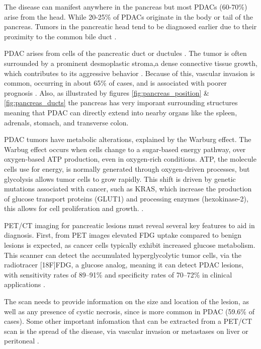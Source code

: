 \documentclass[11pt]{article} %
\begin{document}
The disease can manifest anywhere in the pancreas but most PDACs (60-70\%) arise from the head. While 20-25\% of PDACs originate in the body or tail of the pancreas. Tumors in the pancreatic head tend to be diagnosed earlier due to their proximity to the common bile duct \cite{stark2015}.

PDAC arises from cells of the pancreatic duct or ductules   \cite{stark2015}. The tumor is often surrounded by a prominent desmoplastic stroma,a dense connective tissue growth, which contributes to its aggressive behavior \cite{haeberle2019}. Because of this, vascular invasion is common, occurring in about 65\% of cases, and is associated with poorer prognosis \cite{hong2012}. Also, as illustrated by figures \ref{fig:pancreas_position} \& \ref{fig:pancreas_ducts} the pancreas has very imporant surrounding structures meaning that PDAC can directly extend into nearby organs like the spleen, adrenals, stomach, and transverse colon. \cite{radiopaedia_pda}


PDAC tumors have metabolic alterations, explained by the Warburg effect.\cite{Hammond2024} The Warbug effect occurs when cells change to a sugar-based energy pathway, over oxygen-based ATP production, even in oxygen-rich conditions. ATP, the molecule cells use for energy, is normally generated through oxygen-driven processes, but glycolysis allows tumor cells to grow rapidly. This shift is driven by genetic mutations associated with cancer, such as KRAS, which increase the production of glucose transport proteins (GLUT1) and processing enzymes (hexokinase-2), this allows for cell proliferation and growth. \cite{Pubmed30721664, Pu2021}.


PET/CT imaging for pancreatic lesions must reveal several key features to aid in diagnosis. First, from PET images elevated FDG uptake compared to benign lesions is expected, as cancer cells typically exhibit increased glucose metabolism. This scanner can detect the accumulated hyperglycolytic tumor cells, via the radiotracer [18F]FDG, a glucose analog, meaning it can detect PDAC lesions, with sensitivity rates of 89–91\% and specificity rates of 70–72\% in clinical applications \cite{Pu2021}.

The scan needs to provide information on the size and location of the lesion, as well as any presence of cystic necrosis, since is more common in PDAC (59.6\% of cases). Some other important infomation that can be extracted from a PET/CT scan is the spread of the disease, via vascular invasion or metastases on liver or peritoneal \cite{parikh2020fdg}.  
\end{document}
